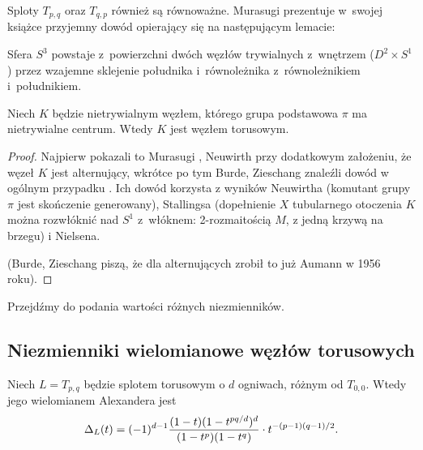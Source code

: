 Sploty $T_{p, q}$ oraz $T_{q, p}$ również są równoważne.
Murasugi prezentuje w~swojej książce \cite{murasugi96} przyjemny dowód opierający się na następującym lemacie:

\begin{lemma}
    Sfera $S^3$ powstaje z~powierzchni dwóch węzłów trywialnych z~wnętrzem ($D^2 \times S^1$) przez wzajemne sklejenie południka i~równoleżnika z~równoleżnikiem i~południkiem.
\end{lemma}

\begin{proposition}
    Niech $K$ będzie nietrywialnym węzłem, którego grupa podstawowa $\pi$ ma nietrywialne centrum.
    Wtedy $K$ jest węzłem torusowym.
\end{proposition}

\begin{proof}
%
%
%
%
%
%
    Najpierw pokazali to Murasugi \cite{murasugi61}, Neuwirth \cite{neuwirth61} przy dodatkowym założeniu, że węzeł $K$ jest alternujący,
    wkrótce po tym Burde, Zieschang znaleźli dowód w ogólnym przypadku \cite{burde66}.
    Ich dowód korzysta z wyników Neuwirtha (komutant grupy $\pi$ jest skończenie generowany), Stallingsa (dopełnienie $X$ tubularnego otoczenia $K$ można rozwłóknić nad $S^1$ z~włóknem: 2-rozmaitością $M$, z jedną krzywą na brzegu) i Nielsena.

    (Burde, Zieschang piszą, że dla alternujących zrobił to już Aumann w 1956 roku).
\end{proof}

Przejdźmy do podania wartości różnych niezmienników.

\subsection{Niezmienniki wielomianowe węzłów torusowych}
\begin{proposition}
    Niech $L = T_{p, q}$ będzie splotem torusowym o $d$ ogniwach, różnym od $T_{0, 0}$.
%
    Wtedy jego wielomianem Alexandera jest
    \begin{equation}
        \Delta_L(t) = (-1)^{d-1} \frac{(1-t)(1 - t^{pq/d})^d}{(1-t^p)(1-t^q)} \cdot t^{-(p-1)(q-1)/2}.
    \end{equation}
\end{proposition}

